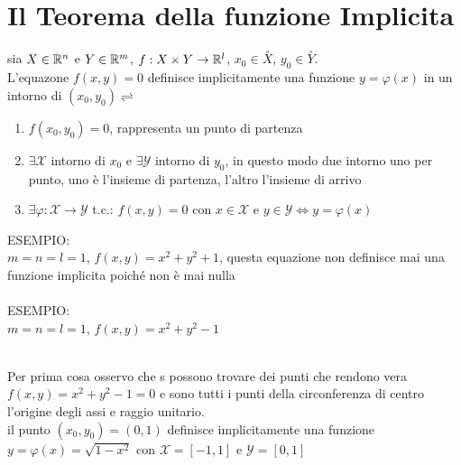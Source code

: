 \section{Il Teorema della funzione Implicita}
sia $X\in \mathbb{R}^n$ e $Y\in \mathbb{R}^m$, $f:X\times Y\to \mathbb{\mathbb{R}}^l$, $x_0\in \overset{\circ}{X}$, $y_0\in \overset{\circ}{Y}$.\\
L'equazone $f(x,y)=0$ definisce implicitamente una funzione $y=\varphi(x)$ in un intorno di $(x_0,y_0) \rightleftharpoons$
\begin{enumerate}
	\item $f(x_0,y_0)=0$, rappresenta un punto di partenza 
	\item $\exists \mathcal{X}$ intorno di $x_0$ e $\exists \mathcal{Y}$ intorno di $y_0$, in questo modo due intorno uno per punto, uno è l'insieme di partenza, l'altro l'insieme di arrivo
	\item $\exists\varphi:\mathcal{X}\rightarrow\mathcal{Y}$ t.c.: $f(x,y)=0$ con $x\in\mathcal{X}$ e $y\in\mathcal{Y} \Leftrightarrow y=\varphi(x)$
\end{enumerate}
ESEMPIO:\\
$m=n=l=1$, $f(x,y)=x^2+y^2+1$, questa equazione non definisce mai una funzione implicita poiché non è mai nulla\\
\\
ESEMPIO:\\
$m=n=l=1$, $f(x,y)=x^2+y^2-1$\\
	\\
	Per prima cosa osservo che s possono trovare dei punti che rendono vera $f(x,y)=x^2+y^2-1=0$ e sono tutti i punti della circonferenza di centro l'origine degli assi e raggio unitario.\\
	il punto $(x_0,y_0)=(0,1)$ definisce implicitamente una funzione $y=\varphi(x)=\sqrt{1-x^2}$ con $\mathcal{X}=[-1,1]$ e $\mathcal{Y}=[0,1]$\\
